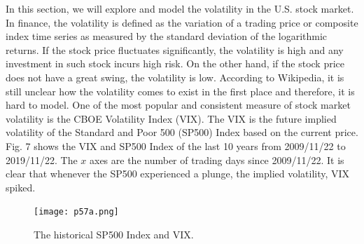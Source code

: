 \documentclass[a4paper, 11pt]{article}
\begin{document}
In this section, we will explore and model the volatility in the U.S. stock market. In finance, the volatility is defined as the variation of a trading price or composite index time series as measured by the standard deviation of the logarithmic returns. If the stock price fluctuates significantly, the volatility is high and any investment in such stock incurs high risk. On the other hand, if the stock price does not have a great swing, the volatility is low. According to Wikipedia, it is still unclear how the volatility comes to exist in the first place and therefore, it is hard to model. One of the most popular and consistent measure of stock market volatility is the CBOE Volatility Index (VIX). The VIX is the future implied volatility of the Standard and Poor 500 (SP500) Index based on the current price. Fig. 7 shows the VIX and SP500 Index of the last 10 years from 2009/11/22 to 2019/11/22. The $x$ axes are the number of trading days since 2009/11/22. It is clear that whenever the SP500 experienced a plunge, the implied volatility, VIX spiked. 

 
\begin{figure}
	\begin{center}
		\texttt{[image: p57a.png]}
		\caption{The historical SP500 Index and VIX. } 
	\end{center}
\end{figure}
\end{document}
